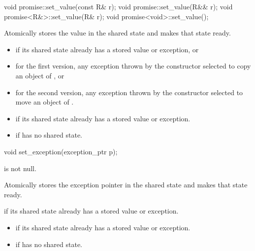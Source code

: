 %
\begin{itemdecl}
void promise::set_value(const R& r);
void promise::set_value(R&& r);
void promise<R&>::set_value(R& r);
void promise<void>::set_value();
\end{itemdecl}

\begin{itemdescr}
\pnum
\effects
Atomically stores the value  in the shared state and
makes that state ready.

\pnum
\throws
\begin{itemize}
\item {} if its shared state
already has a stored value or exception, or
\item for the first version, any exception thrown by the constructor selected to copy an object of , or
\item for the second version, any exception thrown by the constructor selected to move an object of .
\end{itemize}

\pnum
\errors
\begin{itemize}
\item {} if its shared state
already has a stored value or exception.
\item {} if  has no shared state.
\end{itemize}
\end{itemdescr}

%
\begin{itemdecl}
void set_exception(exception_ptr p);
\end{itemdecl}

\begin{itemdescr}
\pnum
\expects
{} is not null.

\pnum
\effects
Atomically stores the exception pointer  in the shared state
and makes that state ready.

\pnum
\throws
{} if its shared state
already has a stored value or exception.

\pnum
\errors

\begin{itemize}
\item {} if its shared state
already has a stored value or exception.
\item {} if  has no shared state.
\end{itemize}
\end{itemdescr}

